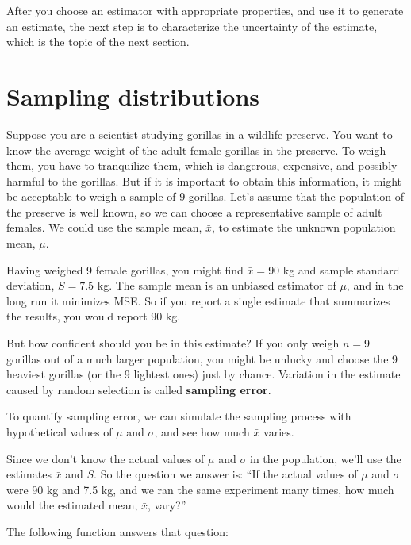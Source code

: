 \documentclass[12pt]{book}
\newcommand{\xbar}{\bar{x}}
\theoremstyle{exercise}
\begin{document}
After you choose an estimator with appropriate properties, and use it to
generate an estimate, the next step is to characterize the
uncertainty of the estimate, which is the topic of the next
section.


\section{Sampling distributions}%
\label{gorilla}

Suppose you are a scientist studying gorillas in a wildlife
preserve.  You want to know the average weight of the adult
female gorillas in the preserve.  To weigh them, you have
to tranquilize them, which is dangerous, expensive, and possibly
harmful to the gorillas.  But if it is important to obtain this
information, it might be acceptable to weigh a sample of 9
gorillas.  Let's assume that the population of the preserve is
well known, so we can choose a representative sample of adult
females.  We could use the sample mean, $\xbar$, to estimate the
unknown population mean, $\mu$.%
%
%

Having weighed 9 female gorillas, you might find $\xbar=90$ kg and
sample standard deviation, $S=7.5$ kg.  The sample mean
is an unbiased estimator of $\mu$, and in the long run it
minimizes MSE.  So if you report a single
estimate that summarizes the results, you would report 90 kg.%
%
%
%
%

But how confident should you be in this estimate?  If you only weigh
$n=9$ gorillas out of a much larger population, you might be unlucky
and choose the 9 heaviest gorillas (or the 9 lightest ones) just by
chance.  Variation in the estimate caused by random selection is
called {\bf sampling error}.%

To quantify sampling error, we can simulate the
sampling process with hypothetical values of $\mu$ and $\sigma$, and
see how much $\xbar$ varies.

Since we don't know the actual values of 
$\mu$ and $\sigma$ in the population, we'll use the estimates
$\xbar$ and $S$.
So the question we answer is:
``If the actual values of $\mu$ and $\sigma$ were 90 kg and 7.5 kg,
and we ran the same experiment many times, how much would the
estimated mean, $\xbar$, vary?''

The following function answers that question:
\end{document}
